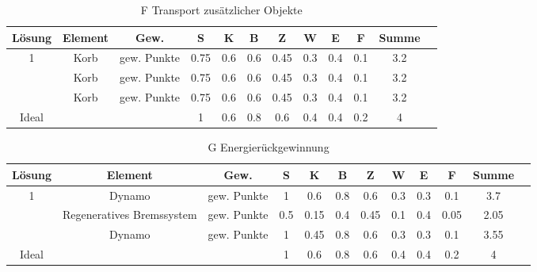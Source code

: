 \documentclass[10pt,a4paper]{article}
\begin{document}
\begin{table}[h!]
    \centering
    \begin{tabular}{cccccccccccc}
        \toprule
        \textbf{Lösung} & \textbf{Element} & \textbf{Gew.} & \textbf{S} & \textbf{K} & \textbf{B} & \textbf{Z} & \textbf{W} & \textbf{E} & \textbf{F} & \textbf{Summe} & \\
        \midrule
        1               & Korb             & gew. Punkte   & 0.75       & 0.6        & 0.6        & 0.45       & 0.3        & 0.4        & 0.1        & 3.2              \\
        \addlinespace
        2               & Korb             & gew. Punkte   & 0.75       & 0.6        & 0.6        & 0.45       & 0.3        & 0.4        & 0.1        & 3.2              \\
        \addlinespace
        3               & Korb             & gew. Punkte   & 0.75       & 0.6        & 0.6        & 0.45       & 0.3        & 0.4        & 0.1        & 3.2              \\
        \midrule
        Ideal           &                  &               & 1          & 0.6        & 0.8        & 0.6        & 0.4        & 0.4        & 0.2        & 4                \\
        \bottomrule
    \end{tabular}
    \caption{F Transport zusätzlicher Objekte}
    \label{tab:transport}
\end{table}

\begin{table}[h!]
    \centering
    \begin{tabular}{cccccccccccc}
        \toprule
        \textbf{Lösung} & \textbf{Element}          & \textbf{Gew.} & \textbf{S} & \textbf{K} & \textbf{B} & \textbf{Z} & \textbf{W} & \textbf{E} & \textbf{F} & \textbf{Summe} & \\
        \midrule
        1               & Dynamo                    & gew. Punkte   & 1          & 0.6        & 0.8        & 0.6        & 0.3        & 0.3        & 0.1        & 3.7              \\
        \addlinespace
        2               & Regeneratives Bremssystem & gew. Punkte   & 0.5        & 0.15       & 0.4        & 0.45       & 0.1        & 0.4        & 0.05       & 2.05             \\
        \addlinespace
        3               & Dynamo                    & gew. Punkte   & 1          & 0.45       & 0.8        & 0.6        & 0.3        & 0.3        & 0.1        & 3.55             \\
        \midrule
        Ideal           &                           &               & 1          & 0.6        & 0.8        & 0.6        & 0.4        & 0.4        & 0.2        & 4                \\
        \bottomrule
    \end{tabular}
    \caption{G Energierückgewinnung}
    \label{tab:energierueckgewinnung}
\end{table}
\end{document}

